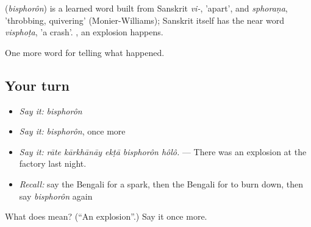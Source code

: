\begin{cousinweb}
\textbf{} (\emph{bisphorôn}) is a learned word built from Sanskrit \emph{vi-}, 'apart', and \emph{sphoraṇa}, 'throbbing, quivering' (Monier-Williams); Sanskrit itself has the near word \emph{visphoṭa}, 'a crash'.  , an explosion happens.
\end{cousinweb}

\begin{grammarlens}[title={What you've built}]
One more word for telling what happened.
\end{grammarlens}

\subsection*{Your turn}
\begin{itemize}
\raggedright
  \item \emph{Say it:} \emph{bisphorôn}
  \item \emph{Say it:} \emph{bisphorôn}, once more
  \item \emph{Say it:} \emph{rāte kārkhānāy ekṭā bisphorôn hôlô.} — There was an explosion at the factory last night.
  \item \emph{Recall:} say the Bengali for a spark, then the Bengali for to burn down, then say \emph{bisphorôn} again
\end{itemize}

\begin{tcolorbox}[breakable,colback=teal!4,colframe=teal!35!black,title={Before you move on}]
What does  mean? (\textquotedblleft{}An explosion\textquotedblright{}.) Say it once more.
\end{tcolorbox}
